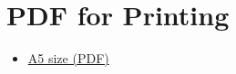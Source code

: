 \chapter{PDF for Printing}

\begin{itemize}
\tightlist
\item
  \href{/pdf/ticivara-thai.pdf}{A5 size (PDF)}
\end{itemize}


